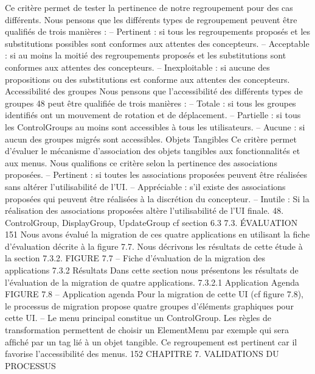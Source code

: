 \documentclass{article}
\begin{document}
Ce crit\`{e}re permet de tester la pertinence de notre regroupement pour des cas diff\'{e}rents. Nous pensons
que les diff\'{e}rents types de regroupement peuvent \^{e}tre qualiﬁ\'{e}s de trois mani\`{e}res :
– Pertinent : si tous les regroupements propos\'{e}s et les substitutions possibles sont conformes aux
attentes des concepteurs.
– Acceptable : si au moins la moiti\'{e} des regroupements propos\'{e}s et les substitutions sont
conformes aux attentes des concepteurs.
– Inexploitable : si aucune des propositions ou des substitutions est conforme aux attentes des
concepteurs.
Accessibilit\'{e} des groupes
Nous pensons que l’accessibilit\'{e} des diff\'{e}rents types de groupes 48 peut
\^{e}tre qualiﬁ\'{e}e de trois mani\`{e}res :
– Totale : si tous les groupes identiﬁ\'{e}s ont un mouvement de rotation et de d\'{e}placement.
– Partielle : si tous les ControlGroups au moins sont accessibles \`{a} tous les utilisateurs.
– Aucune : si aucun des groupes migr\'{e}s sont accessibles.
Objets Tangibles
Ce crit\`{e}re permet d’\'{e}valuer le m\'{e}canisme d’association des objets tangibles aux
fonctionnalit\'{e}s et aux menus. Nous qualiﬁons ce crit\`{e}re selon la pertinence des associations propos\'{e}es.
– Pertinent : si toutes les associations propos\'{e}es peuvent \^{e}tre r\'{e}alis\'{e}es sans alt\'{e}rer l’utilisabilit\'{e}
de l’UI.
– Appr\'{e}ciable : s’il existe des associations propos\'{e}es qui peuvent \^{e}tre r\'{e}alis\'{e}es \`{a} la discr\'{e}tion du
concepteur.
– Inutile : Si la r\'{e}alisation des associations propos\'{e}es alt\`{e}re l’utilisabilit\'{e} de l’UI ﬁnale.
48. ControlGroup, DisplayGroup, UpdateGroup cf section 6.3
7.3. ÉVALUATION
151
Nous avons \'{e}valu\'{e} la migration de ces quatre applications en utilisant la ﬁche d’\'{e}valuation d\'{e}crite
\`{a} la ﬁgure 7.7. Nous d\'{e}crivons les r\'{e}sultats de cette \'{e}tude \`{a} la section 7.3.2.
FIGURE 7.7 – Fiche d’\'{e}valuation de la migration des applications
7.3.2
R\'{e}sultats
Dans cette section nous pr\'{e}sentons les r\'{e}sultats de l’\'{e}valuation de la migration de quatre applications.
7.3.2.1
Application Agenda
FIGURE 7.8 – Application agenda
Pour la migration de cette UI (cf ﬁgure 7.8), le processus de migration propose quatre groupes
d’\'{e}l\'{e}ments graphiques pour cette UI.
– Le menu principal constitue un ControlGroup. Les r\`{e}gles de transformation permettent de choisir un ElementMenu par exemple qui sera afﬁch\'{e} par un tag li\'{e} \`{a} un objet tangible. Ce regroupement est pertinent car il favorise l’accessibilit\'{e} des menus.
152
CHAPITRE 7. VALIDATIONS DU PROCESSUS
\end{document}
